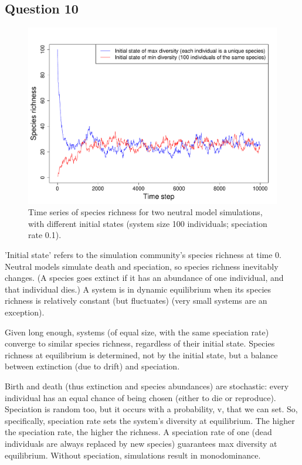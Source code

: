 \documentclass[11pt]{article}
\begin{document}
\subsection*{Question 10}
\begin{figure}[h]
\centering
\includegraphics[width=0.8\linewidth]{../Results/Question_10.pdf}
\caption{Time series of species richness for two neutral model simulations, with different initial states (system size 100 individuals; speciation rate 0.1).}
\end{figure}

'Initial state' refers to the simulation community's species richness at time 0. Neutral models simulate death and speciation, so species richness inevitably changes. (A species goes extinct if it has an abundance of one individual, and that individual dies.) A system is in dynamic equilibrium when its species richness is relatively constant (but fluctuates) (very small systems are an exception).

Given long enough, systems (of equal size, with the same speciation rate) converge to similar species richness, regardless of their initial state. Species richness at equilibrium is determined, not by the initial state, but a balance between extinction (due to drift) and speciation.

Birth and death (thus extinction and species abundances) are stochastic: every individual has an equal chance of being chosen (either to die or reproduce). Speciation is random too, but it occurs with a probability, v, that we can set. So, specifically, speciation rate sets the system's diversity at equilibrium. The higher the speciation rate, the higher the richness. A speciation rate of one (dead individuals are always replaced by new species) guarantees max diversity at equilibrium. Without speciation, simulations result in monodominance.
\end{document}
